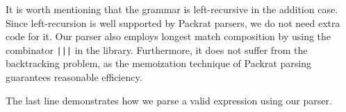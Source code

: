 
It is worth mentioning that the grammar is left-recursive in the addition case. Since left-recursion is well supported by Packrat parsers, we do not need extra code for it. Our parser also employs longest match composition by using the combinator \lstinline{|||} in the library. Furthermore, it does not suffer from the backtracking problem, as the memoization technique of Packrat parsing guarantees reasonable efficiency.

The last line demonstrates how we parse a valid expression  using our parser.

